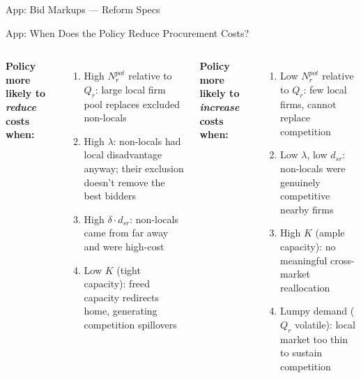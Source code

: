 \documentclass[9pt,aspectratio=169]{beamer}
\begin{document}
\begin{frame}{App: Bid Markups --- Reform Specs}
\centering
\scriptsize
\resizebox{\linewidth}{!}{%

}
\end{frame}


\begin{frame}{App: When Does the Policy Reduce Procurement Costs?}
\begin{columns}[T]
  \textbf{Policy more likely to \emph{reduce} costs when:}
  \begin{enumerate}
    \item High $N_r^{pot}$ relative to $Q_r$: large local firm pool
          replaces excluded non-locals
    \item High $\lambda$: non-locals had local disadvantage anyway;
          their exclusion doesn't remove the best bidders
    \item High $\delta \cdot d_{sr}$: non-locals came from far away
          and were high-cost
    \item Low $K$ (tight capacity): freed capacity redirects home,
          generating competition spillovers
  \end{enumerate}

  \textbf{Policy more likely to \emph{increase} costs when:}
  \begin{enumerate}
    \item Low $N_r^{pot}$ relative to $Q_r$: few local firms,
          cannot replace competition
    \item Low $\lambda$, low $d_{sr}$: non-locals were genuinely
          competitive nearby firms
    \item High $K$ (ample capacity): no meaningful cross-market
          reallocation
    \item Lumpy demand ($Q_r$ volatile): local market too thin to
          sustain competition
  \end{enumerate}
\end{columns}
\end{frame}
\end{document}
